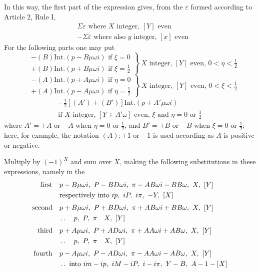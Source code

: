 In this way, the first part of the expression gives, from the $\varepsilon$ formed according to Article $2$, Rule I,
\[
\begin{aligned}
&\Sigma\varepsilon\text{ where }X\text{ integer, }[Y]\text{ even}\\
&-\Sigma\varepsilon\text{ where also }y\text{ integer, }[x]\text{ even}
\end{aligned}
\]
For the following parts one may put
\[
\left.\begin{aligned}
&-(B)\mathrm{Int.}(p-B\mu\omega i)\text{ if }\xi=0\\
&+(B)\mathrm{Int.}(p+B\mu\omega i)\text{ if }\xi=\tfrac12
\end{aligned}\right\}\ X\text{ integer, }[Y]\text{ even, }0<\eta<\tfrac12
\]
\[
\left.\begin{aligned}
&-(A)\mathrm{Int.}(p+A\mu\omega i)\text{ if }\eta=0\\
&+(A)\mathrm{Int.}(p-A\mu\omega i)\text{ if }\eta=\tfrac12
\end{aligned}\right\}\ X\text{ integer, }[Y]\text{ even, }0<\xi<\tfrac12
\]
\[
\begin{gathered}
-\tfrac12[(A')+(B')]\mathrm{Int.}(p+A'\mu\omega i)\\
\text{if }X\text{ integer, }[Y+A'\omega]\text{ even, }\xi\text{ and }\eta=0\text{ or }\tfrac12
\end{gathered}
\]
where $A'=+A$ or $-A$ when $\eta=0$ or $\tfrac12$, and $B'=+B$ or $-B$ when $\xi=0$ or $\tfrac12$; here, for example, the notation $(A):+1$ or $-1$ is used according as $A$ is positive or negative.

Multiply by $(-1)^X$ and sum over $X$, making the following substitutions in these expressions, namely in the
\[
\begin{aligned}
\text{first}\quad&p-B\mu\omega i,\ P-BD\omega i,\ \pi-AB\omega i-BB\omega,\ X,\ [Y]\\
&\text{respectively into }ip,\ iP,\ i\pi,\ -Y,\ [X]\\[3pt]
\text{second}\quad&p+B\mu\omega i,\ P+BD\omega i,\ \pi+AB\omega i+BB\omega,\ X,\ [Y]\\
&\mathinner{.\,.}\quad p,\ P,\ \pi\quad X,\ [Y]\\[3pt]
\text{third}\quad&p+A\mu\omega i,\ P+AD\omega i,\ \pi+AA\omega i+AB\omega,\ X,\ [Y]\\
&\mathinner{.\,.}\quad p,\ P,\ \pi\quad X,\ [Y]\\[3pt]
\text{fourth}\quad&p-A\mu\omega i,\ P-AD\omega i,\ \pi-AA\omega i-AB\omega,\ X,\ [Y]\\
&\mathinner{.\,.}\text{ into }im-ip,\ iM-iP,\ i-i\pi,\ Y-B,\ A-1-[X]
\end{aligned}
\]

